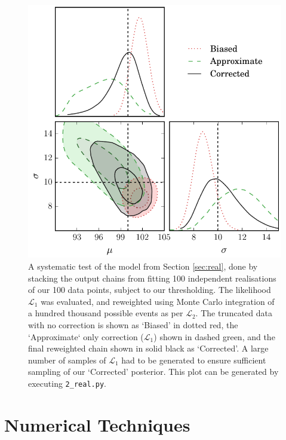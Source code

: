 \documentclass[a4paper,fleqn,usenatbib]{mnras}
\begin{document}
\begin{figure}
	\begin{center}
		\includegraphics[width=\columnwidth]{fig_2_real.pdf}
	\end{center}
	\caption{A systematic test of the model from Section \ref{sec:real}, done by stacking the output chains from fitting 100 independent realisations of our 100 data points, subject to our thresholding. The likelihood $\mathcal{L}_1$ was evaluated, and reweighted using Monte Carlo integration of a hundred thousand possible events as per $\mathcal{L}_2$. The truncated data with no correction is shown as `Biased' in dotted red, the `Approximate` only correction ($\mathcal{L}_1$) shown in dashed green, and the final reweighted chain shown in solid black as `Corrected'. A large number of samples of $\mathcal{L}_1$ had to be generated to ensure sufficient sampling of our `Corrected' posterior. This plot can be generated by executing \mbox{\texttt{2\_real.py}}.}
	\label{fig:real}
\end{figure}



\section{Numerical Techniques}
\label{sec:tricks}
\end{document}
